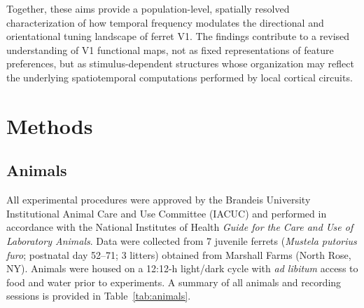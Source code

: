 \documentclass{brandeis-thesis3.3}
\begin{document}
Together, these aims provide a population-level, spatially resolved
characterization of how temporal frequency modulates the directional
and orientational tuning landscape of ferret V1. The findings
contribute to a revised understanding of V1 functional maps, not as
fixed representations of feature preferences, but as stimulus-dependent
structures whose organization may reflect the underlying spatiotemporal
computations performed by local cortical circuits.


\chapter{Methods}

\section{Animals}

All experimental procedures were approved by the Brandeis
University Institutional Animal Care and Use Committee (IACUC)
and performed in accordance with the National Institutes of
Health \textit{Guide for the Care and Use of Laboratory Animals}.
Data were collected from 7 juvenile ferrets
(\textit{Mustela putorius furo}; postnatal day 52--71;
3 litters) obtained from Marshall Farms (North Rose, NY).
Animals were housed on a 12:12-h light/dark cycle with
\textit{ad libitum} access to food and water prior to
experiments. A summary of all animals and recording sessions
is provided in Table~\ref{tab:animals}.
\end{document}
